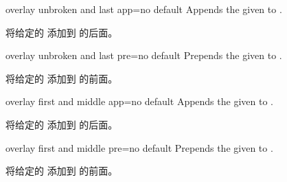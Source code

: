 \begin{docTcbKey}{overlay unbroken and last app}{=}{no default}
Appends the given  to .

将给定的  添加到  的后面。
\end{docTcbKey}

\begin{docTcbKey}{overlay unbroken and last pre}{=}{no default}
Prepends the given  to .

将给定的  添加到  的前面。
\end{docTcbKey}

\begin{docTcbKey}[][doc new=2014-09-19]{overlay first and middle app}{=}{no default}
Appends the given  to .

将给定的  添加到  的后面。
\end{docTcbKey}

\begin{docTcbKey}[][doc new=2014-09-19]{overlay first and middle pre}{=}{no default}
Prepends the given  to .

将给定的  添加到  的前面。
\end{docTcbKey}
